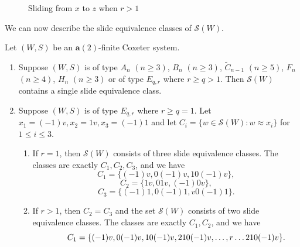 \documentclass[ALCO,Unicode,published]{cedram}
\newcommand{\la}{\mathbf{a}}
\newcommand{\sw}{\mathcal{S}(W)}
\newcommand{\tul}{\textup{(}}
\newcommand{\tur}{\textup{)}}
\begin{document}
\begin{example}
\begin{figure}
        \caption{Sliding from $x$ to $z$ when $r>1$}
        \label{fig:sliding}
    \end{figure} 
\end{example}

   
    We can now describe the slide equivalence classes of $\sw$.

    \begin{prop}
        \label{prop:desClasses}
        Let $(W,S)$ be an $\la(2)$-finite Coxeter system.
\begin{enumerate}
    \item Suppose $(W,S)$ is of type $A_n$ $(n\ge 3)$, $B_n$ $(n\ge 3)$, $\tilde C_{n-1}$ $(n\ge 5)$, $F_n$ $(n\ge
         4)$, $H_n$ $(n\ge 3)$ or of type $E_{q,r}$ where $r\ge q>1$. Then $\sw$ contains a single slide
         equivalence class.
    \item Suppose $(W,S)$ is of type $E_{q,r}$ where $r\ge q=1$. Let $x_1=(-1)v, x_2=1v,x_3=(-1)1$
         and let $C_i=\{w\in \sw: w\approx x_i\}$ for $1\le i\le 3$. 
        \begin{enumerate}
            \item[\tul a\tur] If $r=1$, then $\sw$ consists of three slide equivalence classes. The
                 classes are exactly $C_1, C_2, C_3$, and we have \[ C_1=\{(-1)v, 0(-1)v,
                 10(-1)v\},\] \[C_2= \{1v, 01v, (-1)0v\},\] \[C_3=\{(-1)1, 0(-1)1, v0(-1)1\}.\]
            \item[\tul b\tur] If $r>1$, then $C_2=C_3$ and the set $\sw$ consists of two slide
                 equivalence classes. The classes are exactly $C_1, C_2$, and we have \[
                 \hspace{2.5em} C_1=\{(-1)v, 0(-1)v, 10(-1)v,210(-1)v,\dots, r\dots 210(-1)v\}.  \]
        \end{enumerate}
\end{enumerate}
    \end{prop}
\end{document}
